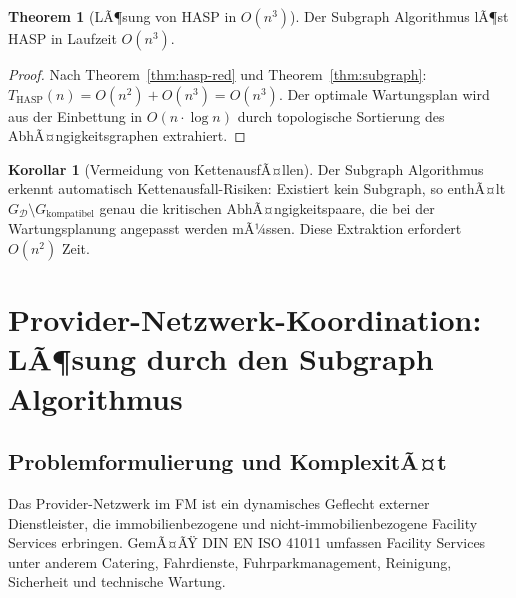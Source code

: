 ﻿\documentclass[a4paper,12pt]{article}
\theoremstyle{definition}
\newtheorem{korollar}{Korollar}[section]
\newtheorem{theorem}{Theorem}[section]
\begin{document}
\begin{theorem}[LÃ¶sung von HASP in $O(n^3)$]
\label{thm:hasp-sol}
Der Subgraph Algorithmus lÃ¶st HASP in Laufzeit $O(n^3)$.
\end{theorem}

\begin{proof}
Nach Theorem~\ref{thm:hasp-red} und Theorem~\ref{thm:subgraph}:
$T_{\mathrm{HASP}}(n) = O(n^2) + O(n^3) = O(n^3)$.
Der optimale Wartungsplan wird aus der Einbettung in $O(n \cdot \log n)$ durch
topologische Sortierung des AbhÃ¤ngigkeitsgraphen extrahiert.
\end{proof}

\begin{korollar}[Vermeidung von KettenausfÃ¤llen]
\label{kor:hasp-ketten}
Der Subgraph Algorithmus erkennt automatisch Kettenausfall-Risiken:
Existiert kein Subgraph, so enthÃ¤lt $G_{\mathcal{D}} \setminus G_{\mathrm{kompatibel}}$
genau die kritischen AbhÃ¤ngigkeitspaare, die bei der Wartungsplanung angepasst werden mÃ¼ssen.
Diese Extraktion erfordert $O(n^2)$ Zeit.
\end{korollar}

\section{Provider-Netzwerk-Koordination: LÃ¶sung durch den Subgraph Algorithmus}
\label{sec:provider}

\subsection{Problemformulierung und KomplexitÃ¤t}

Das Provider-Netzwerk im FM ist ein dynamisches Geflecht externer Dienstleister,
die immobilienbezogene und nicht-immobilienbezogene Facility Services erbringen.
GemÃ¤ÃŸ DIN EN ISO 41011 umfassen Facility Services unter anderem Catering,
Fahrdienste, Fuhrparkmanagement, Reinigung, Sicherheit und technische Wartung.
\end{document}
